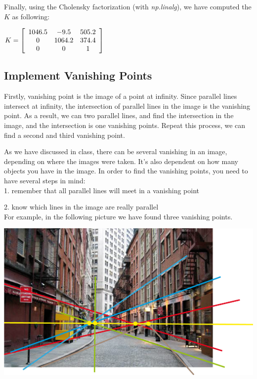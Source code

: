\documentclass[]{article}
\begin{document}
\vspace{0.5em}

Finally, using the Cholensky factorization (with \textit{np.linalg}), we have computed the $K$ as following:

\vspace{0.5em}

\centerline {
	$ K =\left[ {\begin{array}{*{20}c}
		1046.5 & -9.5 & 505.2 \\
		0 & 1064.2 & 374.4 \\
		0 & 0 & 1 
		\end{array} } \right] $
}

\vspace{0.5em}


\subsection{Implement Vanishing Points}

Firstly, vanishing point is the image of a point at infinity. Since parallel lines intersect at infinity, the intersection of parallel lines in the image is the vanishing point. As a result, we can two parallel lines, and find the intersection in the image, and the intersection is one vanishing points. Repeat this process, we can find a second and third vanishing point.

As we have discussed in class, there can be several vanishing in an image, depending on where the images were taken. It's also dependent on how many objects you have in the image. In order to find the vanishing points, you need to have several steps in mind: \\

1. remember that all parallel lines will meet in a vanishing point

2. know which lines in the image are really parallel \\ 

For example, in the following picture we have found three vanishing points. 

\vspace{0.5em}

\centerline {
	\includegraphics[scale=0.4]{vanishing}
}
\end{document}

